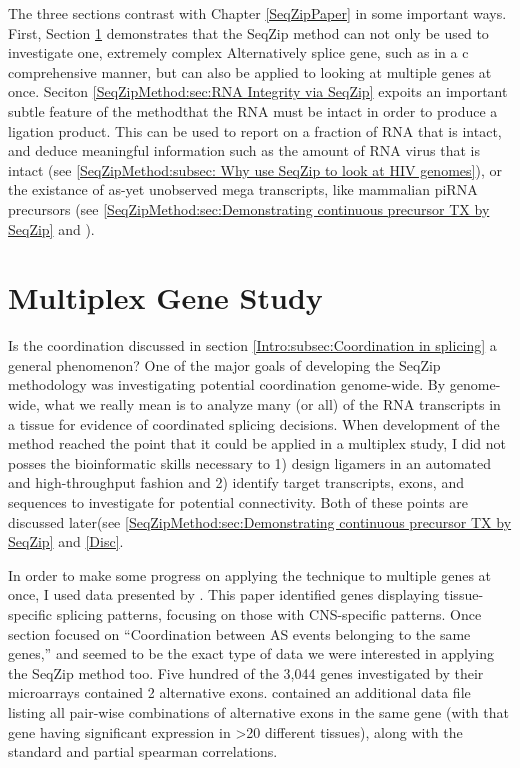   The three sections contrast with Chapter \ref{SeqZipPaper} in some important ways. First, Section \ref{SeqZipMethod:sec:Multiplex Gene Study} demonstrates that the SeqZip method can not only be used to investigate one, extremely complex Alternatively splice gene, such as \dscam{} in a c comprehensive manner, but can also be applied to looking at multiple genes at once. Seciton \ref{SeqZipMethod:sec:RNA Integrity via SeqZip} expoits an important subtle feature of the method\textemdash that the RNA must be intact in order to produce a ligation product. This can be used to report on a fraction of RNA that is intact, and deduce meaningful information such as the amount of RNA virus that is intact (see \ref{SeqZipMethod:subsec: Why use SeqZip to look at HIV genomes}), or the existance of as-yet unobserved mega transcripts, like mammalian piRNA precursors (see \ref{SeqZipMethod:sec:Demonstrating continuous precursor TX by SeqZip} and \citep{Li2013h,Li2013}).

\section{Multiplex Gene Study}\label{SeqZipMethod:sec:Multiplex Gene Study}

  Is the coordination discussed in section \ref{Intro:subsec:Coordination in splicing} a general phenomenon? One of the major goals of developing the SeqZip methodology was investigating potential coordination genome-wide. By genome-wide, what we really mean is to analyze many (or all) of the RNA transcripts in a tissue for evidence of coordinated splicing decisions. When development of the method reached the point that it could be applied in a multiplex study, I did not posses the bioinformatic skills necessary to 1) design ligamers in an automated and high-throughput fashion and 2) identify target transcripts, exons, and sequences to investigate for potential connectivity. Both of these points are discussed later(see \ref{SeqZipMethod:sec:Demonstrating continuous precursor TX by SeqZip} and \ref{Disc}. 

  In order to make some progress on applying the technique to multiple genes at once, I used data presented by \citet{Fagnani2007}. This paper identified genes displaying tissue-specific splicing patterns, focusing on those with CNS-specific patterns. Once section focused on ``Coordination between AS events belonging to the same genes,'' and seemed to be the exact type of data we were interested in applying the SeqZip method too. Five hundred of the 3,044 genes investigated by their microarrays contained 2 alternative exons. \citet{Fagnani2007} contained an additional data file listing all pair-wise combinations of alternative exons in the same gene (with that gene having significant expression in >20 different tissues), along with the standard and partial spearman correlations. 

